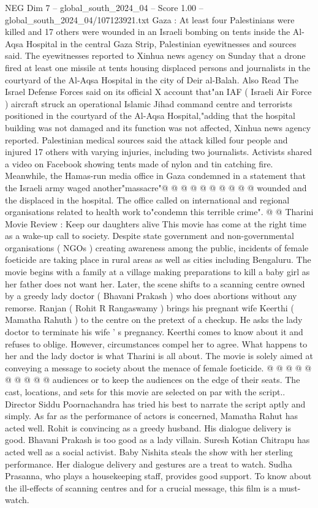 \begin{textsample}{NEG Dim 7 – global\_south\_2024\_04 – Score 1.00 – global\_south\_2024\_04/107123921.txt}  \label{ex:f7_neg_284}
Gaza : At least four Palestinians were killed and 17 others were wounded in an Israeli bombing on tents inside the Al-Aqsa Hospital in the central Gaza Strip, Palestinian eyewitnesses and sources said.
The eyewitnesses reported to Xinhua news agency on Sunday that a drone fired at least one missile at tents housing displaced persons and journalists in the courtyard of the Al-Aqsa Hospital in the city of Deir al-Balah.
Also Read The Israel Defense Forces said on its official X account that"an IAF ( Israeli Air Force ) aircraft struck an operational Islamic Jihad command centre and terrorists positioned in the courtyard of the Al-Aqsa Hospital,"adding that the hospital building was not damaged and its function was not affected, Xinhua news agency reported.
Palestinian medical sources said the attack killed four people and injured 17 others with varying injuries, including two journalists.
Activists shared a video on Facebook showing tents made of nylon and tin catching fire.
Meanwhile, the Hamas-run media office in Gaza condemned in a statement that the Israeli army waged another"massacre"@ @ @ @ @ @ @ @ @ @ wounded and the displaced in the hospital.
The office called on international and regional organisations related to health work to"condemn this terrible crime". @ @ Tharini Movie Review : Keep our daughters alive This movie has come at the right time as a wake-up call to society.
Despite state government and non-governmental organisations ( NGOs ) creating awareness among the public, incidents of female foeticide are taking place in rural areas as well as cities including Bengaluru.
The movie begins with a family at a village making preparations to kill a baby girl as her father does not want her.
Later, the scene shifts to a scanning centre owned by a greedy lady doctor ( Bhavani Prakash ) who does abortions without any remorse.
Ranjan ( Rohit R Rangaswamy ) brings his pregnant wife Keerthi ( Mamatha Rahuth ) to the centre on the pretext of a checkup.
He asks the lady doctor to terminate his wife ' s pregnancy.
Keerthi comes to know about it and refuses to oblige.
However, circumstances compel her to agree.
What happens to her and the lady doctor is what Tharini is all about.
The movie is solely aimed at conveying a message to society about the menace of female foeticide. @ @ @ @ @ @ @ @ @ @ audiences or to keep the audiences on the edge of their seats.
The cast, locations, and sets for this movie are selected on par with the script..
Director Siddu Poornachandra has tried his best to narrate the script aptly and simply.
As far as the performance of actors is concerned, Mamatha Rahut has acted well.
Rohit is convincing as a greedy husband.
His dialogue delivery is good.
Bhavani Prakash is too good as a lady villain.
Suresh Kotian Chitrapu has acted well as a social activist.
Baby Nishita steals the show with her sterling performance.
Her dialogue delivery and gestures are a treat to watch.
Sudha Prasanna, who plays a housekeeping staff, provides good support.
To know about the ill-effects of scanning centres and for a crucial message, this film is a must-watch.

\end{textsample}
